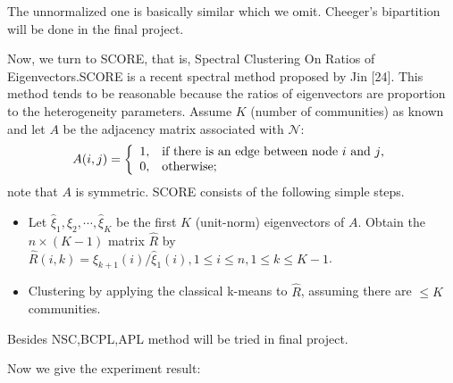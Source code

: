 \documentclass{article}
\numberwithin{equation}{section}
\begin{document}
The unnormalized one is basically similar which we omit. Cheeger's bipartition will be done in the final project.

Now, we turn to SCORE, that is, Spectral Clustering On Ratios of Eigenvectors.SCORE is a recent spectral method proposed by Jin [24]. This method tends to be reasonable because the ratios of eigenvectors are proportion to the heterogeneity parameters. Assume $K$ (number of communities) as known and let $A$ be the adjacency matrix associated with $\mathcal{N}$:
	\[
	A(i,j)=\left\{
	\begin{array}{ll}
	1, & \hbox{if there is an edge between node $i$ and $j$,} \\
	0, & \hbox{otherwise;}
	\end{array}
	\right.
	\]
	note that $A$ is symmetric. SCORE consists of the following simple steps.
	\begin{itemize}
		\item Let $\hat{\xi}_1,\hat{\xi}_2,\cdots,\hat{\xi}_K$ be the first $K$ (unit-norm) eigenvectors of $A$. Obtain the $n \times (K-1)$ matrix $\hat{R}$ by $\hat{R}(i,k)=\hat{\xi}_{k+1}(i)/\hat{\xi}_1(i),1 \leq i \leq n,1\leq k\leq K-1$.
		\item Clustering by applying the classical k-means to $\hat{R}$, assuming there are $\leq K$ communities.
	\end{itemize}
Besides NSC,BCPL,APL method will be tried in final project.

Now we give the experiment result:
\end{document}
